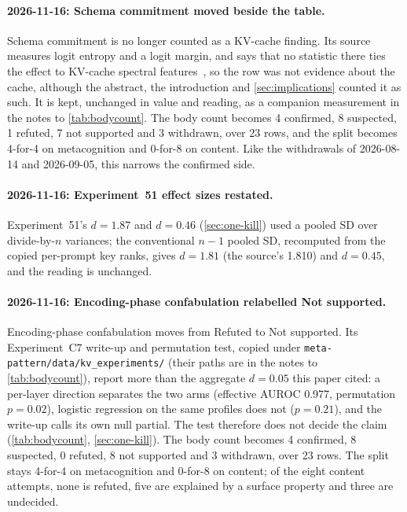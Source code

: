 \documentclass[11pt,a4paper]{article}
\begin{document}
\paragraph{2026-11-16: Schema commitment moved beside the table.}
Schema commitment is no longer counted as a KV-cache finding. Its
source measures logit entropy and a logit margin, and says that no
statistic there ties the effect to KV-cache spectral
features~\citep{lyra2026decision}, so the row was not evidence about
the cache, although the abstract, the introduction and
\cref{sec:implications} counted it as such. It is kept, unchanged in
value and reading, as a companion measurement in the notes to
\cref{tab:bodycount}. The body count becomes 4 confirmed, 8 suspected,
1 refuted, 7 not supported and 3 withdrawn, over 23 rows, and the split
becomes 4-for-4 on metacognition and 0-for-8 on content. Like the
withdrawals of 2026-08-14 and 2026-09-05, this narrows the confirmed
side.

\paragraph{2026-11-16: Experiment~51 effect sizes restated.}
Experiment~51's $d = 1.87$ and $d = 0.46$ (\cref{sec:one-kill}) used a pooled SD over divide-by-$n$ variances; the conventional $n{-}1$ pooled SD, recomputed from the copied per-prompt key ranks, gives $d = 1.81$ (the source's 1.810) and $d = 0.45$, and the reading is unchanged.

\paragraph{2026-11-16: Encoding-phase confabulation relabelled Not supported.}
Encoding-phase confabulation moves from Refuted to Not supported. Its
Experiment~C7 write-up and permutation test, copied under
\nolinkurl{meta-pattern/data/kv_experiments/} (their paths are in the
notes to \cref{tab:bodycount}), report more than the
aggregate $d{=}0.05$ this paper cited: a per-layer direction separates
the two arms (effective AUROC 0.977, permutation $p{=}0.02$), logistic
regression on the same profiles does not ($p{=}0.21$), and the write-up
calls its own null partial. The test therefore does not decide the
claim (\cref{tab:bodycount}, \cref{sec:one-kill}). The body count
becomes 4 confirmed, 8 suspected, 0 refuted, 8 not supported and 3
withdrawn, over 23 rows. The split stays 4-for-4 on metacognition and
0-for-8 on content; of the eight content attempts, none is refuted,
five are explained by a surface property and three are undecided.



\end{document}
